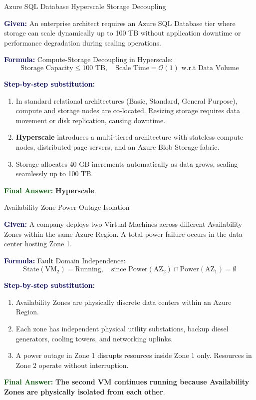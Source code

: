 \documentclass[11pt,a4paper,openany]{report}
\newcommand{\Given}{\par\textbf{\textcolor{navy}{Given:}} }
\newcommand{\Formula}{\par\textbf{\textcolor{navy}{Formula:}} }
\newcommand{\Steps}{\par\textbf{\textcolor{navy}{Step-by-step substitution:}}\par}
\newcommand{\Answer}{\par\textbf{\textcolor{darkgreen}{Final Answer:}} }
\begin{document}
\begin{solved}{Azure SQL Database Hyperscale Storage Decoupling}
\Given An enterprise architect requires an Azure SQL Database tier where storage can scale dynamically up to 100 TB without application downtime or performance degradation during scaling operations.
\Formula Compute-Storage Decoupling in Hyperscale:
\begin{equation}
\text{Storage Capacity} \le 100\text{ TB}, \quad \text{Scale Time} = \mathcal{O}(1) \text{ w.r.t Data Volume}
\end{equation}
\Steps
\begin{enumerate}[leftmargin=*]
  \item In standard relational architectures (Basic, Standard, General Purpose), compute and storage nodes are co-located. Resizing storage requires data movement or disk replication, causing downtime.
  \item \textbf{Hyperscale} introduces a multi-tiered architecture with stateless compute nodes, distributed page servers, and an Azure Blob Storage fabric.
  \item Storage allocates 40 GB increments automatically as data grows, scaling seamlessly up to 100 TB.
\end{enumerate}
\Answer \textbf{Hyperscale}.
\end{solved}

\begin{solved}{Availability Zone Power Outage Isolation}
\Given A company deploys two Virtual Machines across different Availability Zones within the same Azure Region. A total power failure occurs in the data center hosting Zone 1.
\Formula Fault Domain Independence:
\begin{equation}
\text{State}(\text{VM}_2) = \text{Running}, \quad \text{since } \text{Power}(\text{AZ}_2) \cap \text{Power}(\text{AZ}_1) = \emptyset
\end{equation}
\Steps
\begin{enumerate}[leftmargin=*]
  \item Availability Zones are physically discrete data centers within an Azure Region.
  \item Each zone has independent physical utility substations, backup diesel generators, cooling towers, and networking uplinks.
  \item A power outage in Zone 1 disrupts resources inside Zone 1 only. Resources in Zone 2 operate without interruption.
\end{enumerate}
\Answer \textbf{The second VM continues running because Availability Zones are physically isolated from each other}.
\end{solved}
\end{document}
